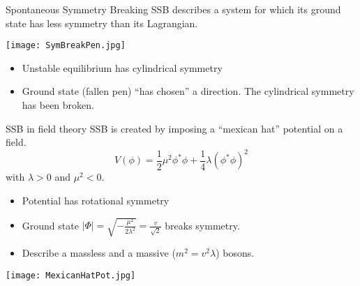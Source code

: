 

\begin{frame}{Spontaneous Symmetry Breaking}
  SSB describes a system for which its ground state has less symmetry than its Lagrangian.

  \texttt{[image: SymBreakPen.jpg]}
  \begin{itemize}
  \item Unstable equilibrium has cylindrical symmetry
  \item Ground state (fallen pen) ``has chosen'' a direction.
    The cylindrical symmetry has been broken.
  \end{itemize}
\end{frame}
\begin{frame}{SSB in field theory}
  SSB is created by imposing a ``mexican hat'' potential on a field.
  \begin{equation}
    \label{eq:orgdea495d}
    V(\phi) = \frac{1}{2}\mu^2\phi^*\phi+\frac{1}{4}\lambda(\phi^*\phi)^2
  \end{equation}
  with  $\lambda>0$ and $\mu^2 <0$.
  
  \begin{minipage}{0.49\linewidth}
  \begin{itemize}
  \item Potential has rotational symmetry
  \item Ground state $|\Phi|=\sqrt{-\frac{\mu^2}{2\lambda^2}}= \frac{v}{\sqrt{2}}$ breaks symmetry.
  \item Describe a massless and a massive ($m^2=v^2\lambda$) bosons.
  \end{itemize}
  \end{minipage}
  \hfill
  \begin{minipage}{0.49\linewidth}
    \texttt{[image: MexicanHatPot.jpg]}
  \end{minipage}
\end{frame}
